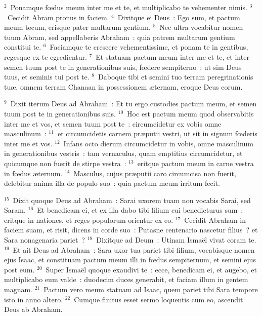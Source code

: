 ${}^{2}$~Ponamque fœdus meum inter me et te, et multiplicabo te vehementer nimis.
${}^{3}$~Cecidit Abram pronus in faciem.
${}^{4}$~Dixitque ei Deus~: Ego sum, et pactum meum tecum, erisque pater multarum gentium.
${}^{5}$~Nec ultra vocabitur nomen tuum Abram, sed appellaberis Abraham~: quia patrem multarum gentium constitui te.
${}^{6}$~Faciamque te crescere vehementissime, et ponam te in gentibus, regesque ex te egredientur.
${}^{7}$~Et statuam pactum meum inter me et te, et inter semen tuum post te in generationibus suis, fœdere sempiterno~: ut sim Deus tuus, et seminis tui post te.
${}^{8}$~Daboque tibi et semini tuo terram peregrinationis tu\ae , omnem terram Chanaan in possessionem \ae ternam, eroque Deus eorum.


${}^{9}$~Dixit iterum Deus ad Abraham~: Et tu ergo custodies pactum meum, et semen tuum post te in generationibus suis.
${}^{10}$~Hoc est pactum meum quod observabitis inter me et vos, et semen tuum post te~: circumcidetur ex vobis omne masculinum~:
${}^{11}$~et circumcidetis carnem pr\ae putii vestri, ut sit in signum fœderis inter me et vos.
${}^{12}$~Infans octo dierum circumcidetur in vobis, omne masculinum in generationibus vestris~: tam vernaculus, quam emptitius circumcidetur, et quicumque non fuerit de stirpe vestra~:
${}^{13}$~eritque pactum meum in carne vestra in fœdus \ae ternum.
${}^{14}$~Masculus, cujus pr\ae putii caro circumcisa non fuerit, delebitur anima illa de populo suo~: quia pactum meum irritum fecit.


${}^{15}$~Dixit quoque Deus ad Abraham~: Sarai uxorem tuam non vocabis Sarai, sed Saram.
${}^{16}$~Et benedicam ei, et ex illa dabo tibi filium cui benedicturus sum~: eritque in nationes, et reges populorum orientur ex eo.
${}^{17}$~Cecidit Abraham in faciem suam, et risit, dicens in corde suo~: Putasne centenario nascetur filius~? et Sara nonagenaria pariet~?
${}^{18}$~Dixitque ad Deum~: Utinam Isma\"el vivat coram te.
${}^{19}$~Et ait Deus ad Abraham~: Sara uxor tua pariet tibi filium, vocabisque nomen ejus Isaac, et constituam pactum meum illi in fœdus sempiternum, et semini ejus post eum.
${}^{20}$~Super Isma\"el quoque exaudivi te~: ecce, benedicam ei, et augebo, et multiplicabo eum valde~: duodecim duces generabit, et faciam illum in gentem magnam.
${}^{21}$~Pactum vero meum statuam ad Isaac, quem pariet tibi Sara tempore isto in anno altero.
${}^{22}$~Cumque finitus esset sermo loquentis cum eo, ascendit Deus ab Abraham.


